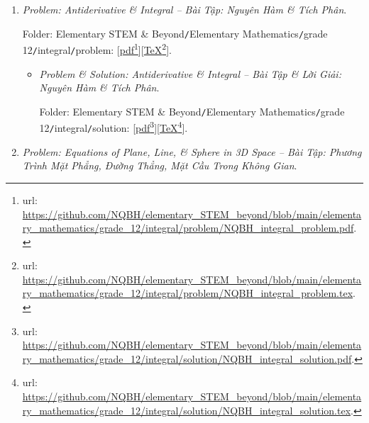 \documentclass[12pt]{article}
\begin{document}
\begin{enumerate}
\begin{itemize}
		Folder: {\sf Elementary STEM \& Beyond{\tt/}Elementary Mathematics{\tt/}grade 12{\tt/}statistical sample{\tt/}solution}: [\href{https://github.com/NQBH/elementary_STEM_beyond/blob/main/elementary_mathematics/grade_12/statistical_sample/solution/NQBH_probability_statistics_solution.pdf}{pdf}\footnote{{\sc url}: \url{https://github.com/NQBH/elementary_STEM_beyond/blob/main/elementary_mathematics/grade_12/statistical_sample/solution/NQBH_probability_statistics_solution.pdf}.}][\href{https://github.com/NQBH/elementary_STEM_beyond/blob/main/elementary_mathematics/grade_12/statistical_sample/solution/NQBH_probability_statistics_solution.tex}{\TeX}\footnote{{\sc url}: \url{https://github.com/NQBH/elementary_STEM_beyond/blob/main/elementary_mathematics/grade_12/statistical_sample/solution/NQBH_probability_statistics_solution.tex}.}].
	\end{itemize}
	\item {\it Problem: Antiderivative \& Integral -- Bài Tập: Nguyên Hàm \& Tích Phân}.
	
	Folder: {\sf Elementary STEM \& Beyond{\tt/}Elementary Mathematics{\tt/}grade 12{\tt/}integral{\tt/}problem}: [\href{https://github.com/NQBH/elementary_STEM_beyond/blob/main/elementary_mathematics/grade_12/integral/problem/NQBH_integral_problem.pdf}{pdf}\footnote{{\sc url}: \url{https://github.com/NQBH/elementary_STEM_beyond/blob/main/elementary_mathematics/grade_12/integral/problem/NQBH_integral_problem.pdf}.}][\href{https://github.com/NQBH/elementary_STEM_beyond/blob/main/elementary_mathematics/grade_12/integral/problem/NQBH_integral_problem.tex}{\TeX}\footnote{{\sc url}: \url{https://github.com/NQBH/elementary_STEM_beyond/blob/main/elementary_mathematics/grade_12/integral/problem/NQBH_integral_problem.tex}.}].
	\begin{itemize}
		\item {\it Problem \& Solution: Antiderivative \& Integral -- Bài Tập \& Lời Giải: Nguyên Hàm \& Tích Phân}.
		
		Folder: {\sf Elementary STEM \& Beyond{\tt/}Elementary Mathematics{\tt/}grade 12{\tt/}integral{\tt/}solution}: [\href{https://github.com/NQBH/elementary_STEM_beyond/blob/main/elementary_mathematics/grade_12/integral/solution/NQBH_integral_solution.pdf}{pdf}\footnote{{\sc url}: \url{https://github.com/NQBH/elementary_STEM_beyond/blob/main/elementary_mathematics/grade_12/integral/solution/NQBH_integral_solution.pdf}.}][\href{https://github.com/NQBH/elementary_STEM_beyond/blob/main/elementary_mathematics/grade_12/integral/solution/NQBH_integral_solution.tex}{\TeX}\footnote{{\sc url}: \url{https://github.com/NQBH/elementary_STEM_beyond/blob/main/elementary_mathematics/grade_12/integral/solution/NQBH_integral_solution.tex}.}].
	\end{itemize}
	\item {\it Problem: Equations of Plane, Line, {\it\&} Sphere in 3D Space -- Bài Tập: Phương Trình Mặt Phẳng, Đường Thẳng, Mặt Cầu Trong Không Gian}.
	

\end{enumerate}
\end{document}
